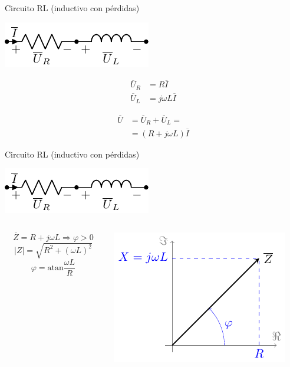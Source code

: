 \documentclass[aspectratio=169, usenames,svgnames,dvipsnames]{beamer}
\newcommand{\atan}{\mathrm{atan}}
\begin{document}
\begin{frame}[label={sec:org6eea115}]{Circuito RL (inductivo con pérdidas)}
\begin{center}
\includegraphics[height=0.2\textheight]{../figs/RL.pdf}
\end{center}

\begin{align*}
  \overline{U}_R &= R \overline{I}\\
  \overline{U}_L &= j\omega L \overline{I}
\end{align*}

\begin{align*}
  \overline{U} &= \overline{U}_R + \overline{U}_L =\\
	       &=(R + j\omega L) \overline{I}
\end{align*}
\end{frame}
\begin{frame}[label={sec:org0f1bc0d}]{Circuito RL (inductivo con pérdidas)}
\begin{center}
\includegraphics[height=0.2\textheight]{../figs/RL.pdf}
\end{center}

\begin{columns}
\begin{column}{0.45\columnwidth}
\[
\overline{Z} = R + j\omega L \Rightarrow \boxed{\varphi > 0}
\]
\[
  |Z| = \sqrt{R^2 + (\omega L)^2}
\]
\[
  \varphi = \atan{\frac{\omega L}{R}}
\]
\end{column}

\begin{column}{0.55\columnwidth}
\begin{center}
\includegraphics[width=.9\linewidth]{../figs/fasorInductanciaReal.pdf}
\end{center}
\end{column}
\end{columns}
\end{frame}
\end{document}
